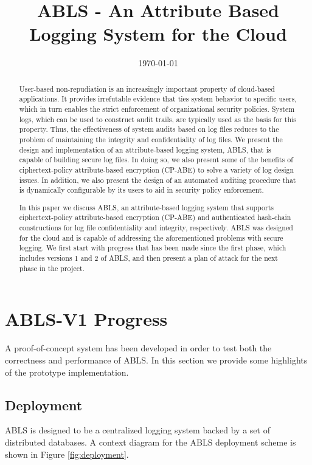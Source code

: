 \documentclass{sig-alternate}
\begin{document}
\title{ABLS - An Attribute Based Logging System for the Cloud}
\author{
}
\date{\today}
\maketitle
\begin{abstract}
User-based non-repudiation is an increasingly important property of cloud-based applications. It provides irrefutable evidence that ties system behavior to specific users, which in turn enables the strict enforcement of organizational security policies. System logs, which can be used to construct audit trails, are typically used as the basis for this property. Thus, the effectiveness of system audits based on log files reduces to the problem of maintaining the integrity and confidentiality of log files. We present the design and implementation of an attribute-based logging system, ABLS, that is capable of building secure log files. In doing so, we also present some of the benefits of ciphertext-policy attribute-based encryption (CP-ABE) to solve a variety of log design issues. In addition, we also present the design of an automated auditing procedure
that is dynamically configurable by its users to aid in security policy enforcement.

In this paper we discuss ABLS, an attribute-based logging system that supports ciphertext-policy 
attribute-based encryption (CP-ABE) \cite{Bethencourt2007-CPABE} and authenticated hash-chain 
constructions for log file confidentiality and integrity, respectively. ABLS was designed for
the cloud and is capable of addressing the aforementioned problems with secure logging. 
We first start with progress that has been made since the first phase, which includes versions
1 and 2 of ABLS, and then present a plan of attack for the next phase in the project. 
\end{abstract}

\section{ABLS-V1 Progress}
A proof-of-concept system has been developed in order to test both the correctness and performance of ABLS. 
In this section we provide some highlights of the prototype implementation.

\subsection{Deployment}
\label{sec:deployment}
ABLS is designed to be a centralized logging system backed by a set of distributed databases. A context
diagram for the ABLS deployment scheme is shown in Figure \ref{fig:deployment}.
\end{document}
